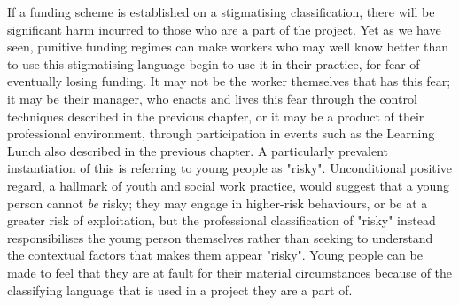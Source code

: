 If a funding scheme is established on a stigmatising classification, there will be significant harm incurred to those who are a part of the project. Yet as we have seen, punitive funding regimes can make workers who may well know better than to use this stigmatising language begin to use it in their practice, for fear of eventually losing funding. It may not be the worker themselves that has this fear; it may be their manager, who enacts and lives this fear through the control techniques described in the previous chapter, or it may be a product of their professional environment, through participation in events such as the Learning Lunch also described in the previous chapter. A particularly prevalent instantiation of this is referring to young people as "risky". Unconditional positive regard, a hallmark of youth and social work practice, would suggest that a young person cannot \emph{be} risky; they may engage in higher-risk behaviours, or be at a greater risk of exploitation, but the professional classification of "risky" instead responsibilises the young person themselves rather than seeking to understand the contextual factors that makes them appear "risky". Young people can be made to feel that they are at fault for their material circumstances because of the classifying language that is used in a project they are a part of.

